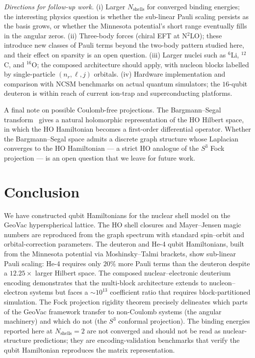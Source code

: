 \documentclass[twocolumn,prc,amsmath,amssymb,superscriptaddress]{revtex4-2}
\begin{document}
\emph{Directions for follow-up work.} (i) Larger
$N_{\mathrm{shells}}$ for converged binding energies; the interesting
physics question is whether the sub-linear Pauli scaling persists as
the basis grows, or whether the Minnesota potential's short range
eventually fills in the angular zeros. (ii) Three-body forces (chiral
EFT at N$^2$LO); these introduce new classes of Pauli terms beyond
the two-body pattern studied here, and their effect on sparsity is an
open question. (iii) Larger nuclei such as $^6$Li, $^{12}$C, and
$^{16}$O; the composed architecture should apply, with nucleon
blocks labelled by single-particle $(n_r, \ell, j)$ orbitals. (iv)
Hardware implementation and comparison with NCSM benchmarks on
actual quantum simulators; the $16$-qubit deuteron is within reach
of current ion-trap and superconducting platforms.

A final note on possible Coulomb-free projections. The Bargmann--Segal
transform~\cite{Bargmann1961} gives a natural holomorphic
representation of the HO Hilbert space, in which the HO Hamiltonian
becomes a first-order differential operator. Whether the
Bargmann--Segal space admits a discrete graph structure whose
Laplacian converges to the HO Hamiltonian --- a strict HO analogue of
the $S^3$ Fock projection --- is an open question that we leave for
future work.

\section{Conclusion}
\label{sec:conclusion}

We have constructed qubit Hamiltonians for the nuclear shell model on
the GeoVac hyperspherical lattice. The HO shell closures and
Mayer--Jensen magic numbers are reproduced from the graph spectrum with
standard spin--orbit and orbital-correction parameters. The deuteron
and He-4 qubit Hamiltonians, built from the Minnesota potential via
Moshinsky--Talmi brackets, show sub-linear Pauli scaling: He-4 requires
only $20\%$ more Pauli terms than the deuteron despite a $12.25\times$
larger Hilbert space. The composed nuclear--electronic deuterium
encoding demonstrates that the multi-block architecture extends to
nucleon--electron systems but faces a $\sim 10^{13}$ coefficient ratio that
requires block-partitioned simulation. The Fock projection rigidity
theorem precisely delineates which parts of the GeoVac framework
transfer to non-Coulomb systems (the angular machinery) and which do
not (the $S^3$ conformal projection). The binding energies reported
here at $N_{\mathrm{shells}}=2$ are not converged and should not be
read as nuclear-structure predictions; they are encoding-validation
benchmarks that verify the qubit Hamiltonian reproduces the matrix
representation.
\end{document}
